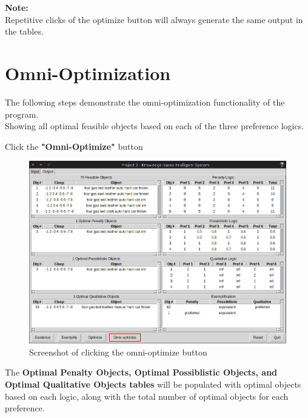 \documentclass[12pt]{report}
\begin{document}
\textbf{Note:} \\
Repetitive clicks of the optimize button will always generate the same output in the tables.

\newpage
\section{Omni-Optimization}
The following steps demonstrate the omni-optimization functionality of the program. \\
Showing all optimal feasible objects based on each of the three preference logics.\\

\begin{description}[leftmargin=4em]
\item [Step 1:]  Click the \textbf{"Omni-Optimize"} button
\begin{figure}[H]
\begin{center}
\includegraphics[scale=0.3,trim=1cm 1cm 1cm 1cm]{omni-optimize}
\caption{Screenshot of clicking the omni-optimize button}
\end{center}
\end{figure}
\vspace{-2.5em}
\item [Result:] The \textbf{Optimal Penalty Objects, Optimal Possiblistic Objects, and Optimal Qualitative Objects tables} will be populated with optimal objects based on each logic, along with the total number of optimal objects for each preference.
\begin{figure}[H]
\begin{center}

\end{center}
\end{figure}
\end{description}
\end{document}

